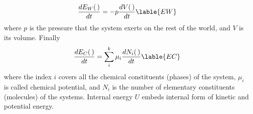 \begin{equation}
\frac{dE_W(\,)}{dt} = - p \frac{dV(\,)}{dt}
\lable{EW}
\end{equation}
where $p$ is the pressure that the system exerts on the rest of the world, and $V$ is its volume. 
Finally
\begin{equation}
\frac{dE_C(\,)}{dt} = \sum_i^k \mu_i \frac{dN_i(\,)}{dt}
\lable{EC}
\end{equation}
where the index $i$ covers all the chemical constituents (phases) of the system, $\mu_i$ is called chemical potential, and $N_i$ is the number of elementary constituents (molecules) of the systems.
Internal energy $U$ embeds internal form of kinetic and potential energy. 

